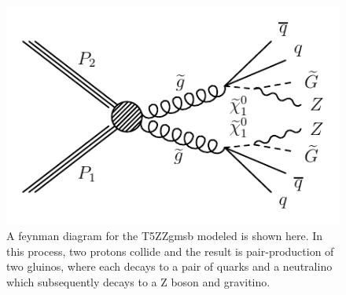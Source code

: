 \begin{figure}[!htb]
  \begin{center}
    \includegraphics[]{intro/figs/Feynman_graph_T5ZZgmsb.pdf}
    \caption{
      \label{fig:SMS_T5ZZgmsb}
      A feynman diagram for the T5ZZgmsb modeled is shown here.
      In this process, two protons collide and the result is pair-production of two gluinos,
      where each decays to a pair of quarks and a neutralino which subsequently decays to a Z boson and gravitino.
    }
  \end{center}
\end{figure}
